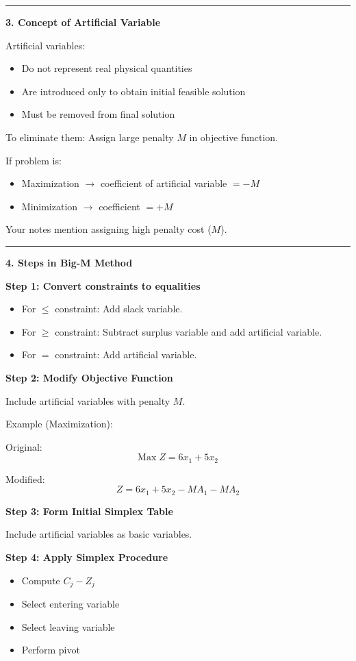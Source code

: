 \documentclass[10pt,a4paper]{article}
\newcommand{\separator}{\vspace{0.4em}\noindent\rule{\linewidth}{0.6pt}\vspace{0.4em}}
\begin{document}
\separator

\textbf{3. Concept of Artificial Variable}

Artificial variables:
\begin{itemize}
  \item Do not represent real physical quantities
  \item Are introduced only to obtain initial feasible solution
  \item Must be removed from final solution
\end{itemize}

To eliminate them: Assign large penalty $M$ in objective function.

If problem is:
\begin{itemize}
  \item Maximization $\rightarrow$ coefficient of artificial variable $= -M$
  \item Minimization $\rightarrow$ coefficient $= +M$
\end{itemize}

Your notes mention assigning high penalty cost ($M$).

\separator

\textbf{4. Steps in Big-M Method}

\textbf{Step 1: Convert constraints to equalities}
\begin{itemize}
  \item For $\leq$ constraint: Add slack variable.
  \item For $\geq$ constraint: Subtract surplus variable and add artificial variable.
  \item For $=$ constraint: Add artificial variable.
\end{itemize}

\textbf{Step 2: Modify Objective Function}

Include artificial variables with penalty $M$.

Example (Maximization):

Original:
\[
\text{Max}\; Z = 6x_1 + 5x_2
\]

Modified:
\[
Z = 6x_1 + 5x_2 - MA_1 - MA_2
\]

\textbf{Step 3: Form Initial Simplex Table}

Include artificial variables as basic variables.

\textbf{Step 4: Apply Simplex Procedure}
\begin{itemize}
  \item Compute $C_j - Z_j$
  \item Select entering variable
  \item Select leaving variable
  \item Perform pivot
\end{itemize}
\end{document}
